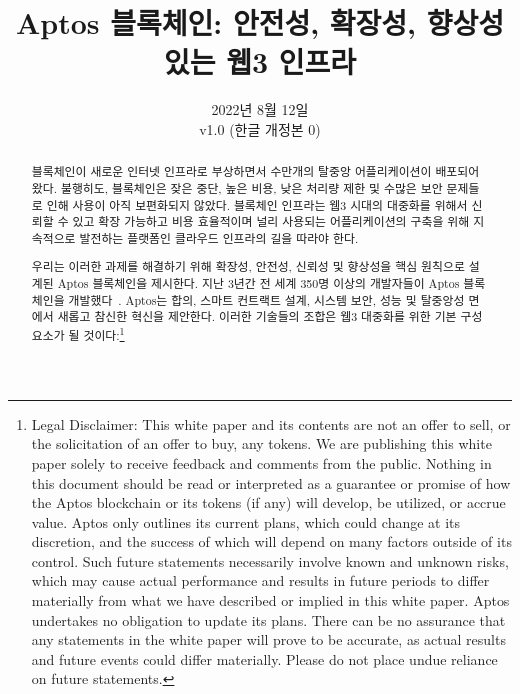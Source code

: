 \documentclass{article}
\title{Aptos 블록체인: 안전성, 확장성, 향상성 있는 웹3 인프라}
\author{}
\date{2022년 8월 12일\\v1.0 (한글 개정본 0)}
\begin{document}
\maketitle

\renewcommand{\abstractname}{초록}
\renewcommand{\figurename}{그림}

\begin{abstract}
블록체인이 새로운 인터넷 인프라로 부상하면서 수만개의 탈중앙 어플리케이션이 배포되어 왔다. 불행히도, 블록체인은 잦은 중단, 높은 비용, 낮은 처리량 제한 및 수많은 보안 문제들로 인해 사용이 아직 보편화되지 않았다. 블록체인 인프라는 웹3 시대의 대중화를 위해서 신뢰할 수 있고 확장 가능하고 비용 효율적이며 널리 사용되는 어플리케이션의 구축을 위해 지속적으로 발전하는 플랫폼인 클라우드 인프라의 길을 따라야 한다.

우리는 이러한 과제를 해결하기 위해 확장성, 안전성, 신뢰성 및 향상성을 핵심 원칙으로 설계된  Aptos 블록체인을 제시한다. 지난 3년간 전 세계 350명 이상의 개발자들이 Aptos 블록체인을 개발했다~\cite{aptos_core_github}. Aptos는 합의, 스마트 컨트랙트 설계, 시스템 보안, 성능 및 탈중앙성 면에서 새롭고 참신한 혁신을 제안한다. 이러한 기술들의 조합은 웹3 대중화를 위한 기본 구성 요소가 될 것이다:\footnote{Legal Disclaimer: This white paper and its contents are not an offer to sell, or the solicitation of an offer to buy, any tokens. We are publishing this white paper solely to receive feedback and comments from the public. Nothing in this document should be read or interpreted as a guarantee or promise of how the Aptos blockchain or its tokens (if any) will develop, be utilized, or accrue value. Aptos only outlines its current plans, which could change at its discretion, and the success of which will depend on many factors outside of its control. Such future statements necessarily involve known and unknown risks, which may cause actual performance and results in future periods to differ materially from what we have described or implied in this white paper. Aptos undertakes no obligation to update its plans. There can be no assurance that any statements in the white paper will prove to be accurate, as actual results and future events could differ materially. Please do not place undue reliance on future statements.}
 

\end{abstract}
\end{document}
